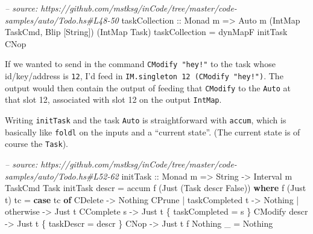 \documentclass[]{article}
\newenvironment{Shaded}{}{}
\newcommand{\KeywordTok}[1]{\textcolor[rgb]{0.00,0.44,0.13}{\textbf{{#1}}}}
\newcommand{\DataTypeTok}[1]{\textcolor[rgb]{0.56,0.13,0.00}{{#1}}}
\newcommand{\CommentTok}[1]{\textcolor[rgb]{0.38,0.63,0.69}{\textit{{#1}}}}
\newcommand{\OtherTok}[1]{\textcolor[rgb]{0.00,0.44,0.13}{{#1}}}
\newcommand{\FunctionTok}[1]{\textcolor[rgb]{0.02,0.16,0.49}{{#1}}}
\newcommand{\NormalTok}[1]{{#1}}
\begin{document}
\begin{Shaded}
\begin{Highlighting}[]
\CommentTok{-- source: https://github.com/mstksg/inCode/tree/master/code-samples/auto/Todo.hs#L48-50}
\OtherTok{taskCollection ::} \DataTypeTok{Monad} \NormalTok{m}
               \OtherTok{=>} \DataTypeTok{Auto} \NormalTok{m (}\DataTypeTok{IntMap} \DataTypeTok{TaskCmd}\NormalTok{, }\DataTypeTok{Blip} \NormalTok{[}\DataTypeTok{String}\NormalTok{]) (}\DataTypeTok{IntMap} \DataTypeTok{Task}\NormalTok{)}
\NormalTok{taskCollection }\FunctionTok{=} \NormalTok{dynMapF initTask }\DataTypeTok{CNop}
\end{Highlighting}
\end{Shaded}

If we wanted to send in the command \texttt{CModify\ "hey!"} to the task
whose id/key/address is \texttt{12}, I'd feed in
\texttt{IM.singleton\ 12\ (CModify\ "hey!")}. The output would then
contain the output of feeding that \texttt{CModify} to the \texttt{Auto}
at that slot 12, associated with slot 12 on the output \texttt{IntMap}.

Writing \texttt{initTask} and the task \texttt{Auto} is straightforward
with \texttt{accum}, which is basically like \texttt{foldl} on the
inputs and a ``current state''. (The current state is of course the
\texttt{Task}).

\begin{Shaded}
\begin{Highlighting}[]
\CommentTok{-- source: https://github.com/mstksg/inCode/tree/master/code-samples/auto/Todo.hs#L52-62}
\OtherTok{initTask ::} \DataTypeTok{Monad} \NormalTok{m }\OtherTok{=>} \DataTypeTok{String} \OtherTok{->} \DataTypeTok{Interval} \NormalTok{m }\DataTypeTok{TaskCmd} \DataTypeTok{Task}
\NormalTok{initTask descr }\FunctionTok{=} \NormalTok{accum f (}\DataTypeTok{Just} \NormalTok{(}\DataTypeTok{Task} \NormalTok{descr }\DataTypeTok{False}\NormalTok{))}
  \KeywordTok{where}
    \NormalTok{f (}\DataTypeTok{Just} \NormalTok{t) tc }\FunctionTok{=} \KeywordTok{case} \NormalTok{tc }\KeywordTok{of}
                      \DataTypeTok{CDelete}                  \OtherTok{->} \DataTypeTok{Nothing}
                      \DataTypeTok{CPrune} \FunctionTok{|} \NormalTok{taskCompleted t }\OtherTok{->} \DataTypeTok{Nothing}
                             \FunctionTok{|} \NormalTok{otherwise       }\OtherTok{->} \DataTypeTok{Just} \NormalTok{t}
                      \DataTypeTok{CComplete} \NormalTok{s              }\OtherTok{->} \DataTypeTok{Just} \NormalTok{t \{ taskCompleted }\FunctionTok{=} \NormalTok{s \}}
                      \DataTypeTok{CModify} \NormalTok{descr            }\OtherTok{->} \DataTypeTok{Just} \NormalTok{t \{ taskDescr }\FunctionTok{=} \NormalTok{descr \}}
                      \DataTypeTok{CNop}                     \OtherTok{->} \DataTypeTok{Just} \NormalTok{t}
    \NormalTok{f }\DataTypeTok{Nothing} \NormalTok{_   }\FunctionTok{=} \DataTypeTok{Nothing}
\end{Highlighting}
\end{Shaded}
\end{document}
